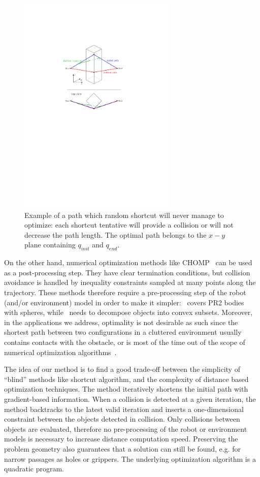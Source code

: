 \documentclass{tADR2e}
\begin{document}
\begin{figure}[H]
	\centering
	\includegraphics[width=7.5cm]{decoupled_DOF_optimization.pdf}
	\caption{Example of a path which random shortcut will never manage to 
	optimize: each shortcut tentative will provide a collision or will not 
	decrease the path length. The optimal path belongs to the $x-y$ plane 
	containing $q_{init}$ and $q_{end}$.}
	\label{decoupled_DOF_optimization}
\end{figure}


On the other hand, numerical
optimization methods like CHOMP~\cite{RatliffChomp} can be used as a
post-processing step. They have clear termination conditions, but collision
avoidance is handled by inequality constraints sampled at many points along
the trajectory. These methods therefore require a pre-processing step of the
robot (and/or environment) model in order to make 
it simpler:~\cite{RatliffChomp} covers PR2 bodies with spheres, 
while~\cite{convexOptimMotplan} needs to decompose objects into convex subsets.
Moreover, in the applications we address, optimality is not desirable as
such since the shortest path between two configurations in a cluttered
environment usually contains contacts with the obstacle,
or is most of the time
out of the scope of numerical optimization algorithms~\cite{LaumondOptim}.

The idea of our method is to find a good trade-off between
the simplicity of “blind” methods like shortcut algorithm,
and the complexity of distance based optimization techniques.
The method iteratively shortens the initial path with gradient-based information.
When a collision is detected at a given iteration, the method backtracks to the
latest valid iteration and inserts a one-dimensional constraint
between the objects detected in collision. Only collisions between objects are 
evaluated, therefore no pre-processing of the
robot or environment models is necessary to increase distance computation speed. 
Preserving the problem geometry also 
guarantees that a solution can still be found, e.g. for narrow passages as holes or 
grippers. The underlying optimization algorithm is a quadratic program.
\end{document}
